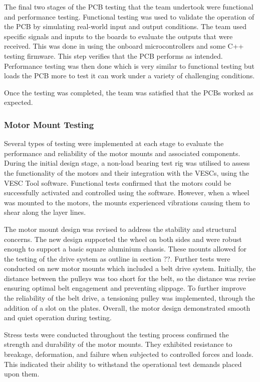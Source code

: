 \documentclass [12pt]{article}
\begin{document}
The final two stages of the PCB testing that the team undertook were functional and performance testing. Functional testing was used to validate the operation of the PCB by simulating real-world input and output conditions. The team used specific signals and inputs to the boards to evaluate the outputs that were received. This was done in using the onboard microcontrollers and some C++ testing firmware. This step verifies that the PCB performs as intended. Performance testing was then done which is very similar to functional testing but loads the PCB more to test it can work under a variety of challenging conditions. 

Once the testing was completed, the team was satisfied that the PCBs worked as expected. 


\subsubsection{Motor Mount Testing}

Several types of testing were implemented at each stage to evaluate the performance and reliability of the motor mounts and associated components.
During the initial design stage, a non-load bearing test rig was utilised to assess the functionality of the motors and their integration with the VESCs, using the VESC Tool software. Functional tests confirmed that the motors could be successfully activated and controlled using the software. However, when a wheel was mounted to the motors, the mounts experienced vibrations causing them to shear along the layer lines.

The motor mount design was revised to address the stability and structural concerns. The new design supported the wheel on both sides and were robust enough to support a basic square aluminium chassis. These mounts allowed for the testing of the drive system as outline in section ??. 
Further tests were conducted on new motor mounts which included a belt drive system. Initially, the distance between the pulleys was too short for the belt, so the distance was revise ensuring optimal belt engagement and preventing slippage. To further improve the reliability of the belt drive, a tensioning pulley was implemented, through the addition of a slot on the plates. Overall, the motor design demonstrated smooth and quiet operation during testing.

Stress tests were conducted throughout the testing process confirmed the strength and durability of the motor mounts. They exhibited resistance to breakage, deformation, and failure when subjected to controlled forces and loads. This indicated their ability to withstand the operational test demands placed upon them.
\end{document}
